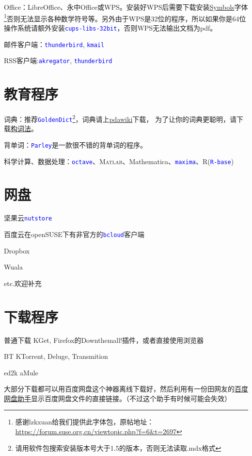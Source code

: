 \documentclass[10pt,openany]{book}
\newcommand{\soft}[1]{\texttt{\textcolor{blue}{#1}}}
\begin{document}
Office：LibreOffice、永中Office或WPS。安装好WPS后需要下载安装\href{http://pan.baidu.com/s/1mgC3A0C}{Symbols}字体\footnote{感谢lzkxuan给我们提供此字体包，原帖地址：\url{https://forum.suse.org.cn/viewtopic.php?f=6&t=2697}}否则无法显示各种数学符号等。另外由于WPS是32位的程序，所以如果你是64位操作系统请额外安装\soft{cups-libs-32bit}，否则WPS无法输出文档为pdf。

邮件客户端：\soft{thunderbird}, \soft{kmail}

RSS客户端:\soft{akregator}, \soft{thunderbird}
\section{教育程序}
词典：推荐\soft{GoldenDict}\footnote{请用软件包搜索安装版本号大于1.5的版本，否则无法读取.mdx格式}，词典请上\href{http://pdawiki.com/forum/forum.php}{pdawiki}下载，
为了让你的词典更聪明，请下载\href{https://zpj.blog.ustc.edu.cn/wp-content/uploads/2014/02/wordsrule.tar.gz}{构词法}。

背单词：\soft{Parley}是一款很不错的背单词的程序。

科学计算、数据处理：\soft{octave}、\textsc{Matlab}、Mathematica、\soft{maxima}、R(\soft{R-base})
\section{网盘}
\begin{compactitem}
 \item 坚果云\soft{nutstore}
 \item 百度云在openSUSE下有非官方的\soft{bcloud}客户端
 \item Dropbox
 \item Wuala
 \item etc.欢迎补充
\end{compactitem}
\section{下载程序}
\begin{compactdesc}
 \item[普通下载] KGet, Firefox的Down\-them\-all!插件，或者直接使用浏览器
 \item[BT] KTorrent, Deluge, Transmition
 \item[ed2k] aMule
\end{compactdesc}

大部分下载都可以用百度网盘这个神器离线下载好，然后利用有一份田网友的\href{http://git.oschina.net/youyifentian/dupanlink}{百度网盘助手}显示百度网盘文件的直接链接。（不过这个助手有时候可能会失效）
\end{document}
